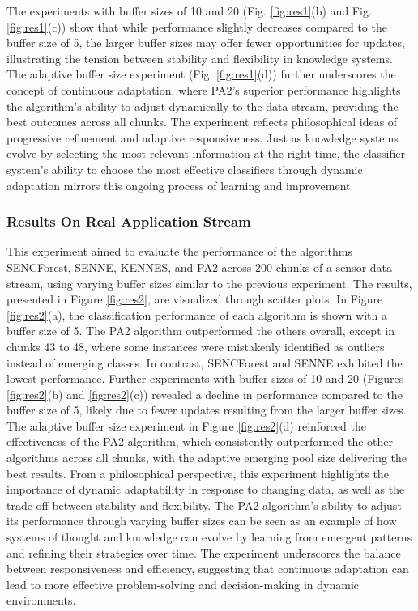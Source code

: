 The experiments with buffer sizes of 10 and 20 (Fig. \ref{fig:res1}(b) and Fig. \ref{fig:res1}(c)) show that while performance slightly decreases compared to the buffer size of 5, the larger buffer sizes may offer fewer opportunities for updates, illustrating the tension between stability and flexibility in knowledge systems. The adaptive buffer size experiment (Fig. \ref{fig:res1}(d)) further underscores the concept of continuous adaptation, where PA2’s superior performance highlights the algorithm’s ability to adjust dynamically to the data stream, providing the best outcomes across all chunks. The experiment reflects philosophical ideas of progressive refinement and adaptive responsiveness. Just as knowledge systems evolve by selecting the most relevant information at the right time, the classifier system's ability to choose the most effective classifiers through dynamic adaptation mirrors this ongoing process of learning and improvement.				

\subsubsection{Results On Real Application Stream}
\label{sec:sensor}
This experiment aimed to evaluate the performance of the algorithms SENCForest, SENNE, KENNES, and PA2 across 200 chunks of a sensor data stream, using varying buffer sizes similar to the previous experiment. The results, presented in Figure \ref{fig:res2}, are visualized through scatter plots. In Figure \ref{fig:res2}(a), the classification performance of each algorithm is shown with a buffer size of 5. The PA2 algorithm outperformed the others overall, except in chunks 43 to 48, where some instances were mistakenly identified as outliers instead of emerging classes. In contrast, SENCForest and SENNE exhibited the lowest performance. Further experiments with buffer sizes of 10 and 20 (Figures \ref{fig:res2}(b) and \ref{fig:res2}(c)) revealed a decline in performance compared to the buffer size of 5, likely due to fewer updates resulting from the larger buffer sizes. The adaptive buffer size experiment in Figure \ref{fig:res2}(d) reinforced the effectiveness of the PA2 algorithm, which consistently outperformed the other algorithms across all chunks, with the adaptive emerging pool size delivering the best results.
From a philosophical perspective, this experiment highlights the importance of dynamic adaptability in response to changing data, as well as the trade-off between stability and flexibility. The PA2 algorithm’s ability to adjust its performance through varying buffer sizes can be seen as an example of how systems of thought and knowledge can evolve by learning from emergent patterns and refining their strategies over time. The experiment underscores the balance between responsiveness and efficiency, suggesting that continuous adaptation can lead to more effective problem-solving and decision-making in dynamic environments.

